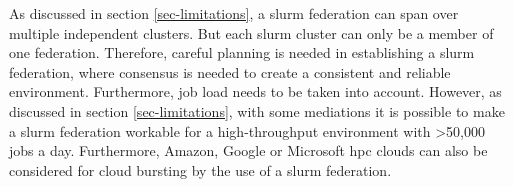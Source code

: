 \documentclass[conference]{IEEEtran}
\begin{document}
As discussed in section \ref{sec-limitations}, a \gls{slurm} federation can span over multiple independent clusters. But each \gls{slurm} cluster can only be a member of one federation. Therefore, careful planning is needed in establishing a \gls{slurm} federation, where consensus is needed to create a consistent and reliable environment. Furthermore, job load needs to be taken into account. However, as discussed in section \ref{sec-limitations}, with some mediations it is possible to make a \gls{slurm} federation workable for a high-throughput environment with \textgreater 50,000 jobs a day. Furthermore, Amazon, Google or Microsoft \gls{hpc} clouds can also be considered for cloud bursting by the use of a \gls{slurm} federation.






\end{document}
